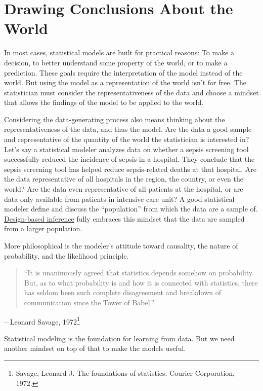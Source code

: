 \documentclass[
  10pt,
]{scrbook}
\begin{document}
\hypertarget{drawing-conclusions-about-the-world}{%
\section{Drawing Conclusions About the World}\label{drawing-conclusions-about-the-world}}

In most cases, statistical models are built for practical reasons:
To make a decision, to better understand some property of the world, or to make a prediction.
These goals require the interpretation of the model instead of the world.
But using the model as a representation of the world isn't for free.
The statistician must consider the representativeness of the data and choose a mindset that allows the findings of the model to be applied to the world.

Considering the data-generating process also means thinking about the representativeness of the data, and thus the model.
Are the data a good sample and representative of the quantity of the world the statistician is interested in?
Let's say a statistical modeler analyzes data on whether a sepsis screening tool successfully reduced the incidence of sepsis in a hospital.
They conclude that the sepsis screening tool has helped reduce sepsis-related deaths at that hospital.
Are the data representative of all hospitals in the region, the country, or even the world?
Are the data even representative of all patients at the hospital, or are data only available from patients in intensive care unit?
A good statistical modeler define and discuss the ``population'' from which the data are a sample of.
\protect\hyperlink{design-based-inference}{Design-based inference} fully embraces this mindset that the data are sampled from a larger population.

More philosophical is the modeler's attitude toward causality, the nature of probability, and the likelihood principle.

\begin{quote}
``It is unanimously agreed that statistics depends somehow on probability. But, as to what probability is and how it is connected with statistics, there has seldom been such complete disagreement and breakdown of communication since the Tower of Babel.''
\end{quote}

-- Leonard Savage, 1972\footnote{Savage, Leonard J. The foundations of statistics. Courier Corporation, 1972.}

Statistical modeling is the foundation for learning from data.
But we need another mindset on top of that to make the models useful.
\end{document}

